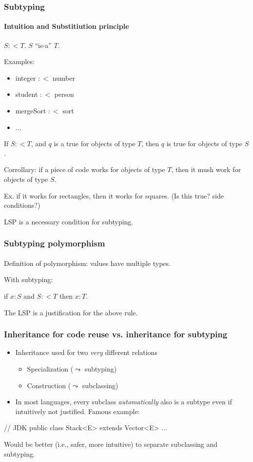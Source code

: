 \documentclass{beamer}
\begin{document}
\begin{frame}[fragile]
\frametitle{Subtyping}
\framesubtitle{Intuition and Substitiution principle}


$S :< T$. $S$ ``is-a'' $T$.

Examples: 

\begin{itemize}
  \item integer $:<$ number
  \item student $:<$ person
  \item mergeSort $:<$ sort
  \item ...
\end{itemize}

\begin{theorem}
  If $S :< T$, and $q$ is a true for objects of type $T$, then $q$ is true for objects of type $S$.
\end{theorem}

Corrollary: if a piece of code works for objects of type $T$, then it mush work for objects of type $S$.

Ex. if it works for rectangles, then it works for squares. (Is this true? side conditions?)

LSP is a necessary condition for subtyping.


\end{frame}


\begin{frame}
\frametitle{Subtyping polymorphism}
\framesubtitle{}

Definition of polymorphism: values have multiple types.

With subtyping:

if $x : S$ and $S :< T$ then $x : T$.

The LSP is a justification for the above rule.
\end{frame}


\begin{frame}[fragile]
\frametitle{Inheritance for code reuse vs. inheritance for subtyping}

\begin{itemize}
\item  Inheritance used for two \textit{very}
different relations
\begin{itemize}
\item Specialization ($\leadsto$ subtyping)
\item Construction   ($\leadsto$ subclassing)
\end{itemize}
\item In most languages, every subclass 
\textit{automatically} also is a  subtype even if
intuitively  not justified. Famous example:
\end{itemize}
\begin{java}
// JDK
public class Stack<E> extends Vector<E> {...}
\end{java}

\bigskip

Would be better (i.e., safer, more intuitive) 
to separate  subclassing and subtyping. 

\end{frame}
\end{document}
